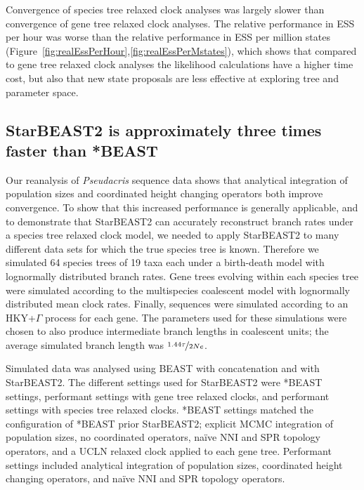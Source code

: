 \documentclass[12pt]{article}
\begin{document}
Convergence of species tree relaxed clock analyses was largely slower than
convergence of gene tree relaxed clock analyses. The relative performance in ESS
per hour was worse than the relative performance in ESS per million states
(Figure~\ref{fig:realEssPerHour},\ref{fig:realEssPerMstates}), which shows that
compared to gene tree relaxed clock analyses the likelihood calculations have a
higher time cost, but also that new state proposals are less effective at
exploring tree and parameter space.

\subsection{StarBEAST2 is approximately three times faster than *BEAST}

Our reanalysis of \textit{Pseudacris} sequence data shows that analytical
integration of population sizes and coordinated height changing operators both
improve convergence. To show that this increased performance is generally
applicable, and to demonstrate that StarBEAST2 can accurately reconstruct branch
rates under a species tree relaxed clock model, we needed to apply StarBEAST2 to
many different data sets for which the true species tree is known. Therefore we
simulated 64 species trees of 19 taxa each under a birth-death model with
lognormally distributed branch rates. Gene trees evolving within each species
tree were simulated according to the multispecies coalescent model with
lognormally distributed mean clock rates. Finally, sequences were simulated
according to an HKY+$\Gamma$ process for each gene. The parameters used for
these simulations were chosen to also produce intermediate branch lengths in
coalescent units; the average simulated branch length was $\nicefrac{1.44\tau}{2Ne}$.

Simulated data was analysed using BEAST with concatenation and with StarBEAST2.
The different settings used for StarBEAST2 were *BEAST settings, performant
settings with gene tree relaxed clocks, and performant settings with species
tree relaxed clocks. *BEAST settings matched the configuration of *BEAST prior
StarBEAST2; explicit MCMC integration of population sizes, no coordinated
operators, na\"ive NNI and SPR topology operators, and a UCLN relaxed clock
applied to each gene tree. Performant settings included analytical integration of
population sizes, coordinated height changing operators, and na\"ive NNI and SPR
topology operators.
\end{document}
